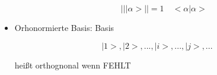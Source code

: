 \documentclass[10pt,article,colorback,accentcolor=tud9d]{scrartcl}
\begin{document}
\begin{itemize}
\begin{itemize}
\begin{fleqn}
\begin{equation}
\left|\right|\left|\right.\alpha>\left|\right| =1 \quad <\alpha\left|\right.\alpha>
\end{equation}
\end{fleqn}
\end{itemize}
\item Orhonormierte Basis: Basis
\begin{fleqn}
\begin{equation}
{\left|\right.1>,\left|\right.2>,...,\left|\right.i>,...,\left|\right.j>,...}
\end{equation}
\end{fleqn}
heißt orthognonal wenn FEHLT
\end{itemize}
\end{document}

